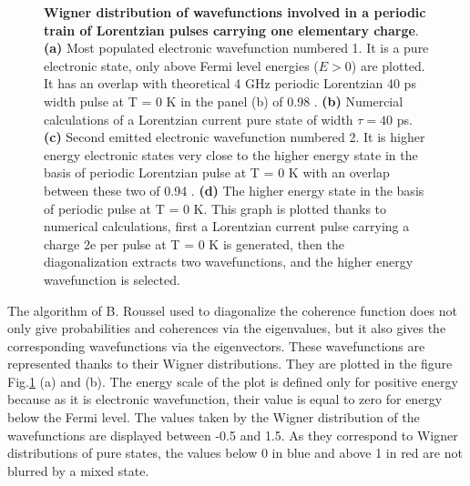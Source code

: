\begin{figure}[hptb]
\begin{center}
\begin{tabular}{c c c c}
		\end{tabular} 
	\end{center}
	\caption{\textbf{Wigner distribution of wavefunctions involved in a periodic train of Lorentzian pulses carrying one elementary charge}. \textbf{(a)} Most populated electronic wavefunction numbered 1. It is a pure electronic state, only above Fermi level energies ($E>0$) are plotted. It has an overlap with theoretical 4 GHz periodic Lorentzian 40 ps width pulse at T = 0 K in the panel (b) of 0.98 . \textbf{(b)} Numercial calculations of a Lorentzian current pure state of width $\tau = 40$ ps. \textbf{(c)} Second emitted electronic wavefunction numbered 2. It is higher energy electronic states very close to the higher energy state in the basis of periodic Lorentzian pulse at T = 0 K with an overlap between these two of 0.94 . \textbf{(d)} The higher energy state in the basis of periodic pulse at T = 0 K. 
	This graph is plotted thanks to numerical calculations, first a Lorentzian current pulse carrying a charge 2e per pulse at T = 0 K is generated, then the diagonalization extracts two wavefunctions, and the higher energy wavefunction is selected. 
	}
	\label{fig: wannier el du 1e 40ps}
\end{figure}

The algorithm of B. Roussel \cite{roussel2017autopsy} used to diagonalize the coherence function does not only give probabilities and coherences via the eigenvalues, but it also gives the corresponding wavefunctions via the eigenvectors. 
These wavefunctions are represented thanks to their Wigner distributions. They are plotted in the figure Fig.\ref{fig: wannier el du 1e 40ps} (a) and (b).
The energy scale of the plot is defined only for positive energy because as it is electronic wavefunction, their value is equal to zero for energy below the Fermi level.
The values taken by the Wigner distribution of the wavefunctions are displayed between -0.5 and 1.5.
As they correspond to Wigner distributions of pure states, the values below 0 in blue and above 1 in red are not blurred by a mixed state.


